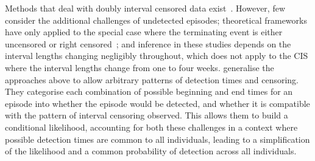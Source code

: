 \documentclass[12pt]{article}
\newcommand\citePersonalComms[1]{(#1, personal communication)}
\begin{document}

Methods that deal with doubly interval censored data exist~\citep{sunStatistical,bogaertsSurvival}.
However, few consider the additional challenges of undetected episodes;
theoretical frameworks~\citep{turnbullEmpirical,dempsterMaximum} have only applied to the special case where the terminating event is either uncensored or right censored~\citep[e.g.][]{sunEmpirical,bacchettiNonparametric,shenNonparametric}; and
inference in these studies depends on the interval lengths changing negligibly throughout, which does not apply to the CIS where the interval lengths change from one to four weeks. %
\citet{heiseyModelling} generalise the approaches above to allow arbitrary patterns of detection times and censoring.
They categorise each combination of possible beginning and end times for an episode into whether the episode would be detected, and whether it is compatible with the pattern of interval censoring observed.
This allows them to build a conditional likelihood, accounting for both these challenges in a context where possible detection times are common to all individuals, leading to a simplification of the likelihood and a common probability of detection across all individuals.
\end{document}
